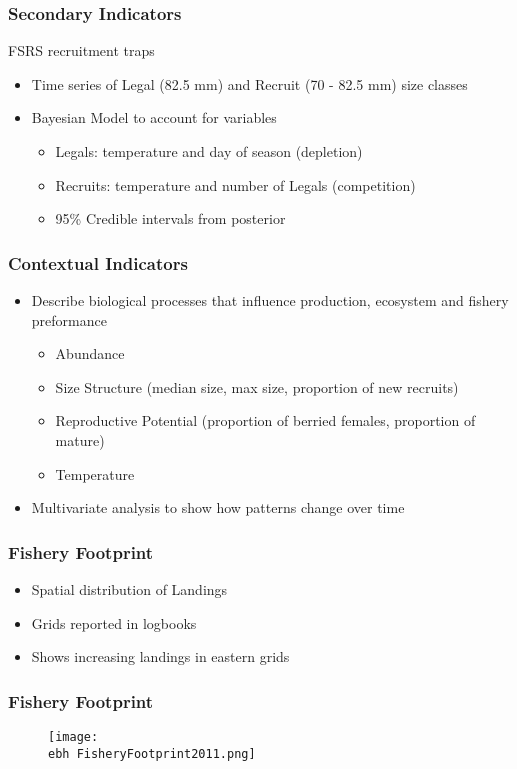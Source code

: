\documentclass{beamer}
\newcommand{\ebh}{\string~/bio.data/bio.lobster/figures/Assessment/LFA2732/} %
\begin{document}
\begin{frame}
\frametitle{Secondary Indicators}
FSRS recruitment traps
\begin{itemize}
    \setlength\itemsep{1em}
\item Time series of Legal (82.5 mm) and Recruit (70 - 82.5 mm) size classes 
\item Bayesian Model to account for variables
\begin{itemize}
\item Legals: temperature and day of season (depletion) 
\item Recruits: temperature and number of Legals (competition) 
\item 95\% Credible intervals from posterior
\end{itemize}
\end{itemize}
\end{frame}


\begin{frame}
\frametitle{Contextual Indicators}
\begin{itemize}
    \setlength\itemsep{1em}
\item Describe biological processes that influence production, ecosystem and fishery preformance
\begin{itemize}
\item Abundance 
\item Size Structure (median size, max size, proportion of new recruits)
\item Reproductive Potential (proportion of berried females, proportion of mature)
\item Temperature 
\end{itemize}
\item Multivariate analysis to show how patterns change over time 
\end{itemize}
\end{frame}


\begin{frame}
\frametitle{Fishery Footprint}
\begin{itemize}
    \setlength\itemsep{2em}
\item Spatial distribution of Landings
\item Grids reported in logbooks
\item Shows increasing landings in eastern grids
\end{itemize}
\end{frame}


\begin{frame}
\frametitle{Fishery Footprint}
\begin{figure}
        \begin{center}
            \texttt{[image: \\ebh FisheryFootprint2011.png]}
        \end{center}
    \end{figure}
\end{frame}
\end{document}
